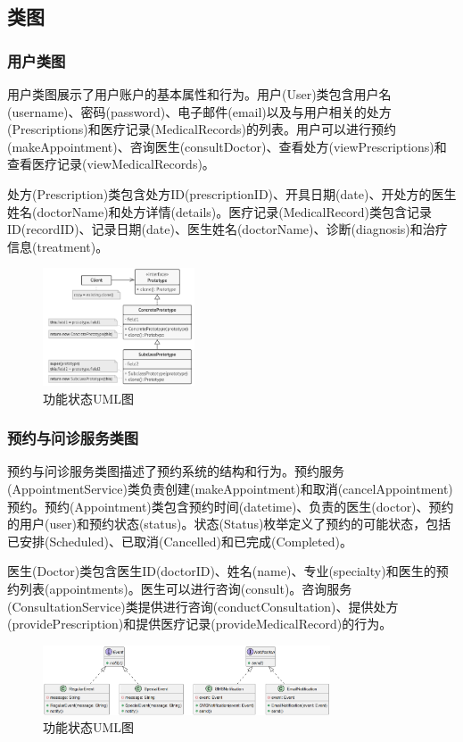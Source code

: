 \subsection{类图}
\subsubsection{用户类图}
用户类图展示了用户账户的基本属性和行为。用户(User)类包含用户名(username)、密码(password)、电子邮件(email)以及与用户相关的处方(Prescriptions)和医疗记录(MedicalRecords)的列表。用户可以进行预约(makeAppointment)、咨询医生(consultDoctor)、查看处方(viewPrescriptions)和查看医疗记录(viewMedicalRecords)。

处方(Prescription)类包含处方ID(prescriptionID)、开具日期(date)、开处方的医生姓名(doctorName)和处方详情(details)。医疗记录(MedicalRecord)类包含记录ID(recordID)、记录日期(date)、医生姓名(doctorName)、诊断(diagnosis)和治疗信息(treatment)。
\begin{figure}[htbp]
	\centering
	\includegraphics[width=0.4\textwidth]{figures/04.png}
	\caption{功能状态UML图}
	\label{fig:functional_state_diagram}
\end{figure}

\subsubsection{预约与问诊服务类图}
预约与问诊服务类图描述了预约系统的结构和行为。预约服务(AppointmentService)类负责创建(makeAppointment)和取消(cancelAppointment)预约。预约(Appointment)类包含预约时间(datetime)、负责的医生(doctor)、预约的用户(user)和预约状态(status)。状态(Status)枚举定义了预约的可能状态，包括已安排(Scheduled)、已取消(Cancelled)和已完成(Completed)。

医生(Doctor)类包含医生ID(doctorID)、姓名(name)、专业(specialty)和医生的预约列表(appointments)。医生可以进行咨询(consult)。咨询服务(ConsultationService)类提供进行咨询(conductConsultation)、提供处方(providePrescription)和提供医疗记录(provideMedicalRecord)的行为。
\begin{figure}[htbp]
	\centering
	\includegraphics[width=0.76\textwidth]{figures/06.png}
	\caption{功能状态UML图}
	\label{fig:functional_state_diagram}
\end{figure}

